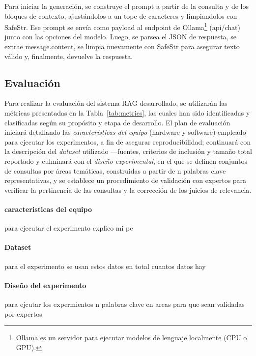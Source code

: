 Para iniciar la generación, se construye el prompt a partir de la consulta y de los bloques de contexto, ajustándolos a un tope de caracteres y limpiandolos con SafeStr. 
Ese prompt se envía como payload al endpoint de Ollama\footnote{Ollama es un servidor para ejecutar modelos de lenguaje localmente (CPU o GPU).} 
(api/chat) junto con las opciones del modelo. Luego, se parsea el JSON de respuesta, se extrae message.content, se limpia nuevamente con SafeStr para asegurar texto válido 
y, finalmente, devuelve la respuesta.


\subsection{Evaluación}
Para realizar la evaluación del sistema RAG desarrollado, se utilizarán las métricas presentadas en la Tabla~\ref{tab:metrics},
las cuales han sido identificadas y clasificadas según su propósito y etapa de desarrollo.
El plan de evaluación iniciará detallando las \textit{características del equipo} (hardware y software) empleado para ejecutar
los experimentos, a fin de asegurar reproducibilidad; continuará con la descripción del \textit{dataset} utilizado —fuentes,
criterios de inclusión y tamaño total reportado y culminará con el \textit{diseño experimental}, en el que se definen
conjuntos de consultas por áreas temáticas, construidas a partir de n palabras clave representativas, y se establece un
procedimiento de validación con expertos para verificar la pertinencia de las consultas y la corrección de los juicios
de relevancia.

\paragraph{caracteristicas del equipo} para ejecutar el experimento explico mi pc
\paragraph{Dataset} para el experimento se usan estos datos en total cuantos datos hay
\paragraph{Diseño del experimento} para ejcutar los expermientos n palabras clave en areas para que sean validadas por
expertos

